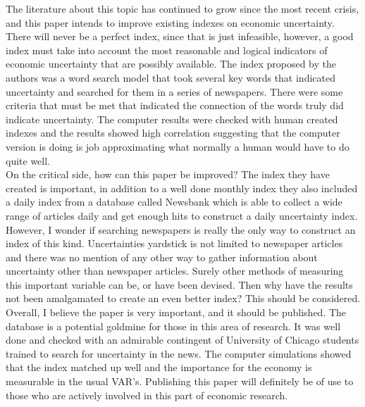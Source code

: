 \documentclass[]{article}
\begin{document}
The literature about this topic has continued to grow since the most recent crisis, and this paper intends to improve existing indexes on economic uncertainty. There will never be a perfect index, since that is just infeasible, however, a good index must take into account the most reasonable and logical indicators of economic uncertainty that are possibly available. The index proposed by the authors was a word search model that took several key words that indicated uncertainty and searched for them in a series of newspapers. There were some criteria that must be met that indicated the connection of the words truly did indicate uncertainty. The computer results were checked with human created indexes and the results showed high correlation suggesting that the computer version is doing is job approximating what normally a human would have to do quite well. \\ 

On the critical side, how can this paper be improved? The index they have created is important, in addition to a well done monthly index they also included a daily index from a database called Newsbank which is able to collect a wide range of articles daily and get enough hits to construct a daily uncertainty index. However, I wonder if searching newspapers is really the only way to construct an index of this kind. Uncertainties yardstick is not limited to newspaper articles and there was no mention of any other way to gather information about uncertainty other than newspaper articles. Surely other methods of measuring this important variable can be, or have been devised. Then why have the results not been amalgamated to create an even better index? This should be considered. \\

Overall, I believe the paper is very important, and it should be published. The database is a potential goldmine for those in this area of research. It was well done and checked with an admirable contingent of University of Chicago students trained to search for uncertainty in the news. The computer simulations showed that the index matched up well and the importance for the economy is measurable in the usual VAR's. Publishing this paper will definitely be of use to those who are actively involved in this part of economic research. 
\end{document}
